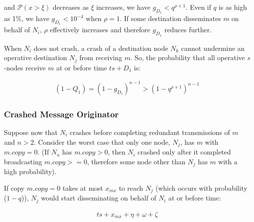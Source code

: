 and $\mathcal{P}(x > \xi)$ decreases as $\xi$ increases, we have $g_{D_1} < q^{\rho+1}$.  Even if $q$ is as high as 1\%, we have $g_{D_1} < 10^{-4}$ when $\rho=1$. If some destination disseminates $m$ on behalf of $N_i$, $\rho$ effectively increases and therefore $g_{D_1}$ reduces further.

When $N_i$ does not crash, a crash of a destination node $N_{k}$ cannot undermine an operative destination $N_{j}$ from receiving $m$. So, the probability that all operative $s$-nodes receive $m$ at or before time $ts +D_1$ is:

        \begin{equation*}
            \begin{aligned}
                (1-Q_1)=(1-g_{D_1})^{n-1}>(1-q^{\rho+1})^{n-1}
            \end{aligned}
        \end{equation*}


        \clearpage
        \subsubsection*{Crashed Message Originator}
Suppose now that $N_i$ crashes before completing redundant transmissions of $m$ and $n>2$. Consider the worst case that only one node, $N_j$, has $m$ with $m.copy=0$. (If $N_u$ has $m.copy>0$, then $N_i$ crashed only after it completed broadcasting $m.copy >= 0$, therefore some node other than $N_j$ has $m$ with a high probability).

If copy $m.copy = 0$ takes at most $x_{mx}$ to reach $N_j$ (which occurs with probability ($1-q$)), $N_j$ would start disseminating on behalf of $N_i$ at or before time:
        
        \begin{equation*}
            \begin{aligned}
                ts+ x_{mx} + \eta + \omega +\zeta
            \end{aligned}
        \end{equation*}
        
